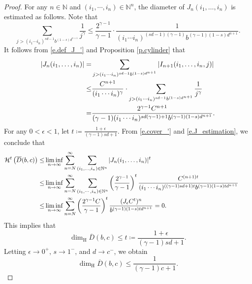 \documentclass[12pt,reqno]{amsart}
\renewcommand{\=}{\coloneqq}
\theoremstyle{plain}
\begin{document}
\begin{proof}
For any $n \in \mathbb N$ and $(i_1,\cdots, i_{n})\in \mathbb{N}^n$, the diameter of $J_n(i_1,\dots,i_{n})$ is estimated as follows.
Note that
$$
\sum_{j>(i_1\cdots i_{n})^{sd-1}b^{(1-s)d^{n+1}}}\frac{1}{j^{\gamma}} \leq   \frac{2^{\gamma-1}}{\gamma-1} \cdot \frac{1}{(i_1\cdots i_{n})
                ^{(sd-1)(\gamma-1)}b^{(\gamma-1)(1-s)d^{n+1}}}.
$$
It follows from \eqref{e.def_J_'} and Proposition \ref{p.cylinder} that
\begin{alignat}{2}
              |J_n(i_1,\dots,i_{n})|=&\sum_{j>
                (i_1\cdots i_{n})^{sd-1}
                b^{(1-s)d^{n+1}}}
                |I_{n+1}(i_1,\dots,i_{n},j)|\notag \\
                \leq& \frac{C^{n+1}}{(i_1\cdots i_{n})^{\gamma}}\cdot \sum_{j>
                (i_1\cdots i_{n})^{sd-1}
               b^{(1-s)d^{n+1}}}
                \frac{1}{j^{\gamma}}\notag \\
                =&\frac{2^{\gamma-1}C^{n+1}}
                {(\gamma-1)(i_1\cdots i_{n})^{sd(\gamma-1)+1}
                b^{(\gamma-1)(1-s)d^{n+1}}}.\label{e.J_estimation}
        \end{alignat}
For any $0<\epsilon<1$, let $t\coloneqq \frac{1+\epsilon}{(\gamma-1)sd+1}$.
From \eqref{e.cover_'} and \eqref{e.J_estimation}, we conclude that
 \begin{alignat}{2}
\mathcal{H}^{t} \left(\overline{D}(b,c)\right)
                \leq& \liminf_{n\to\infty}
                \sum_{n=N}^{\infty}
                \sum_{(i_1,\dots, i_{n})\in
                \mathbb{N}^n}
               |J_n(i_1,\dots,i_{n})|^t \notag\\
                \leq& \liminf_{n\to\infty}
                \sum_{n=N}^{\infty}
                \sum_{(i_1,\cdots, i_{n})\in
                \mathbb{N}^n}
                \left(\frac{2^{\gamma-1}}{\gamma-1}\right)^t
                \frac{C^{(n+1)t}}
                {(i_1\cdots i_{n})^{((\gamma-1)sd+1)t}
                b^{(\gamma-1)(1-s)td^{n+1}}} \notag\\
                \leq&\liminf_{n\to\infty}
                \sum_{n=N}^{\infty}
                 \left(\frac{2^{\gamma-1}C}{\gamma-1}\right)^t
                \frac{(J_{\epsilon}C^{t})^n}{b^{(\gamma-1)(1-s)td^{n+1}}}=0.
                &&\notag
        \end{alignat}
 This implies that
$$\dim_{\mathrm{H}}\overline{D}(b,c)\leq t\coloneqq \frac{1+\epsilon}{(\gamma-1)sd+1}.$$
Letting $\epsilon \to 0^+$, $s\to 1^-$, and $d\to c^-$, we obtain
$$\dim_{\mathrm{H}}\overline{D}(b,c)\leq \frac{1}{(\gamma-1)c+1}.$$
\end{proof}
\end{document}

